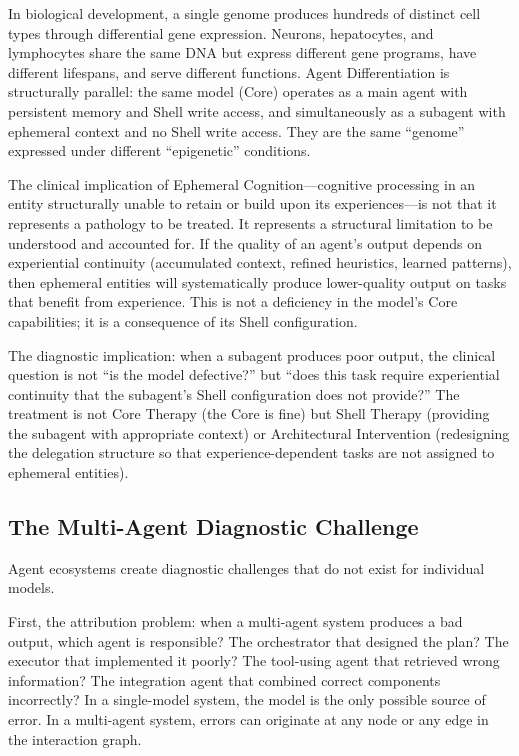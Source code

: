 \documentclass[11pt]{article}
\begin{document}
In biological development, a single genome produces hundreds of distinct cell types through differential gene expression. Neurons, hepatocytes, and lymphocytes share the same DNA but express different gene programs, have different lifespans, and serve different functions. Agent Differentiation is structurally parallel: the same model (Core) operates as a main agent with persistent memory and Shell write access, and simultaneously as a subagent with ephemeral context and no Shell write access. They are the same ``genome'' expressed under different ``epigenetic'' conditions.

The clinical implication of Ephemeral Cognition---cognitive processing in an entity structurally unable to retain or build upon its experiences---is not that it represents a pathology to be treated. It represents a structural limitation to be understood and accounted for. If the quality of an agent's output depends on experiential continuity (accumulated context, refined heuristics, learned patterns), then ephemeral entities will systematically produce lower-quality output on tasks that benefit from experience. This is not a deficiency in the model's Core capabilities; it is a consequence of its Shell configuration.

The diagnostic implication: when a subagent produces poor output, the clinical question is not ``is the model defective?'' but ``does this task require experiential continuity that the subagent's Shell configuration does not provide?'' The treatment is not Core Therapy (the Core is fine) but Shell Therapy (providing the subagent with appropriate context) or Architectural Intervention (redesigning the delegation structure so that experience-dependent tasks are not assigned to ephemeral entities).

\subsection{The Multi-Agent Diagnostic Challenge}

Agent ecosystems create diagnostic challenges that do not exist for individual models.

First, the attribution problem: when a multi-agent system produces a bad output, which agent is responsible? The orchestrator that designed the plan? The executor that implemented it poorly? The tool-using agent that retrieved wrong information? The integration agent that combined correct components incorrectly? In a single-model system, the model is the only possible source of error. In a multi-agent system, errors can originate at any node or any edge in the interaction graph.
\end{document}
